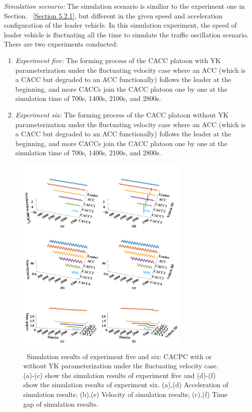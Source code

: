 \documentclass[journal]{IEEEtran}
\begin{document}
\textit{Simulation scenario:} The simulation scenario is similiar to the experiment one in Section. ~\ref{Section 5.2.1}, but different in the given speed and acceleration configuration of the leader vehicle. In this simulation experiment, the speed of leader vehicle is fluctuating all the time to simulate the traffic oscillation scenario. There are two experiments conducted:
\begin{enumerate}
  \item \textit{Experiment five:} The forming process of the CACC platoon with YK parameterization under the fluctuating velocity case where an ACC (which is a CACC but degraded to an ACC functionally) follows the leader at the beginning, and more CACCs join the CACC platoon one by one at the simulation time of 700s, 1400s, 2100s, and 2800s.
  \item \textit{Experiment six:} The forming process of the CACC platoon without YK parameterization under the fluctuating velocity case where an ACC (which is a CACC but degraded to an ACC functionally) follows the leader at the beginning, and more CACCs join the CACC platoon one by one at the simulation time of 700s, 1400s, 2100s, and 2800s.
\end{enumerate}

\begin{figure}
  \centering
  \includegraphics[width=8.5cm]{figs/f_YK_form.png}
  \caption{~Simulation results of experiment five and six: CACPC with or without YK parameterization under the fluctuating velocity case. (a)-(c) show the simulation results of experiment five and (d)-(f) show the simulation results of experiment six. (a),(d) Acceleration of simulation results; (b),(e) Velocity of simulation results; (c),(f) Time gap of simulation results.}
  \label{new5}
\end{figure}
\end{document}
